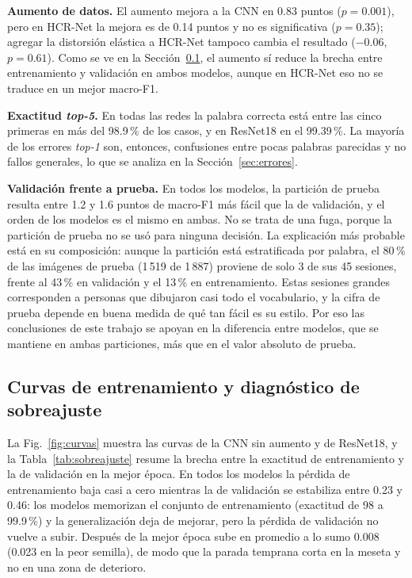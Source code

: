 \documentclass[conference]{IEEEtran}
\begin{document}
\textbf{Aumento de datos.} El aumento mejora a la CNN en 0.83 puntos
($p = 0.001$), pero en HCR-Net la mejora es de 0.14 puntos y no es
significativa ($p = 0.35$); agregar la distorsión elástica a HCR-Net tampoco
cambia el resultado ($-0.06$, $p = 0.61$). Como se ve en la
Sección~\ref{sec:sobreajuste}, el aumento sí reduce la brecha entre
entrenamiento y validación en ambos modelos, aunque en HCR-Net eso no se
traduce en un mejor macro-F1.

\textbf{Exactitud \textit{top-5}.} En todas las redes la palabra correcta
está entre las cinco primeras en más del 98.9\,\% de los casos, y en ResNet18
en el 99.39\,\%. La mayoría de los errores \textit{top-1} son, entonces,
confusiones entre pocas palabras parecidas y no fallos generales, lo que se
analiza en la Sección~\ref{sec:errores}.

\textbf{Validación frente a prueba.} En todos los modelos, la partición de
prueba resulta entre 1.2 y 1.6 puntos de macro-F1 más fácil que la de
validación, y el
orden de los modelos es el mismo en ambas. No se trata de una fuga, porque
la partición de prueba no se usó para ninguna decisión. La explicación más
probable está en su composición: aunque la partición está estratificada por
palabra, el 80\,\% de las imágenes de prueba (1\,519 de 1\,887) proviene de
solo 3 de sus 45 sesiones, frente al 43\,\% en validación y el 13\,\% en
entrenamiento. Estas sesiones grandes corresponden a personas que dibujaron
casi todo el vocabulario, y la cifra de prueba depende en buena medida de qué
tan fácil es su estilo. Por eso las conclusiones de este trabajo se apoyan en
la diferencia entre modelos, que se mantiene en ambas particiones, más que en
el valor absoluto de prueba.

\subsection{Curvas de entrenamiento y diagnóstico de sobreajuste}
\label{sec:sobreajuste}
La Fig.~\ref{fig:curvas} muestra las curvas de la CNN sin aumento y de
ResNet18, y la Tabla~\ref{tab:sobreajuste} resume la brecha entre la
exactitud de entrenamiento y la de validación en la mejor época. En todos los
modelos la pérdida de entrenamiento baja casi a cero mientras la de
validación se estabiliza entre 0.23 y 0.46: los modelos memorizan el
conjunto de entrenamiento (exactitud de 98 a 99.9\,\%) y la generalización
deja de mejorar, pero la pérdida de validación no vuelve a subir. Después de
la mejor época sube en promedio a lo sumo 0.008 (0.023 en la peor semilla),
de modo que la parada temprana corta en la meseta y no en una zona de
deterioro.
\end{document}
